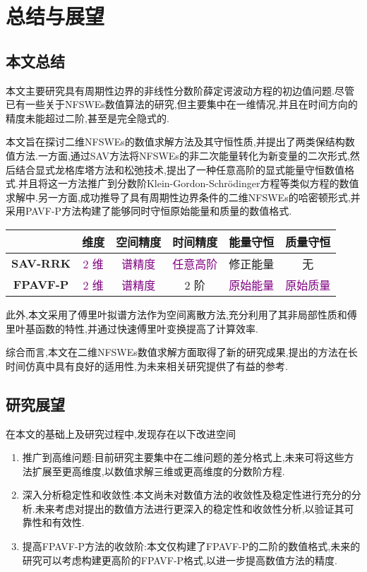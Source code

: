 
\chapter[总结与展望]{总结与展望}
\section{本文总结}
本文主要研究具有周期性边界的非线性分数阶薛定谔波动方程的初边值问题.尽管已有一些关于NFSWEs数值算法的研究,但主要集中在一维情况,并且在时间方向的精度未能超过二阶,甚至是完全隐式的.

本文旨在探讨二维NFSWEs的数值求解方法及其守恒性质,并提出了两类保结构数值方法.一方面,通过SAV方法将NFSWEs的非二次能量转化为新变量的二次形式,然后结合显式龙格库塔方法和松弛技术,提出了一种任意高阶的显式能量守恒数值格式.并且将这一方法推广到分数阶Klein-Gordon-Schr{\"o}dinger方程等类似方程的数值求解中.另一方面,成功推导了具有周期性边界条件的二维NFSWEs的哈密顿形式,并采用PAVF-P方法构建了能够同时守恒原始能量和质量的数值格式.

\begin{table}[H]
    \centering
      \begin{tabular}{cccccc}
      \toprule
      \textcolor[rgb]{0,0,0}{} & \textcolor[rgb]{0,0,0}{\textbf{维度}} & \textcolor[rgb]{0,0,0}{\textbf{空间精度}} & \textcolor[rgb]{0,0,0}{\textbf{时间精度}} & \textcolor[rgb]{0,0,0}{\textbf{能量守恒}} & \textcolor[rgb]{0,0,0}{\textbf{质量守恒}} \\
      \midrule
      \textcolor[rgb]{0,0,0}{\textbf{SAV-RRK}} & \textcolor{purple}{2 维}   & \textcolor{purple}{谱精度}   & \textcolor{purple}{任意高阶}  & 修正能量  & 无 \\
      \midrule
      \textcolor[rgb]{0,0,0}{\textbf{FPAVF-P}} & \textcolor{purple}{2 维}   & \textcolor{purple}{谱精度}   & 2 阶   & \textcolor{purple}{原始能量}  & \textcolor{purple}{原始质量} \\
      \bottomrule
      \end{tabular}%
    \label{tab:3}%
  \end{table}%

此外,本文采用了傅里叶拟谱方法作为空间离散方法,充分利用了其非局部性质和傅里叶基函数的特性,并通过快速傅里叶变换提高了计算效率.

综合而言,本文在二维NFSWEs数值求解方面取得了新的研究成果,提出的方法在长时间仿真中具有良好的适用性,为未来相关研究提供了有益的参考.

\section{研究展望}
在本文的基础上及研究过程中,发现存在以下改进空间

\begin{enumerate}[(1)]
    \item 推广到高维问题:目前研究主要集中在二维问题的差分格式上,未来可将这些方法扩展至更高维度,以数值求解三维或更高维度的分数阶方程.
    
    \item 深入分析稳定性和收敛性:本文尚未对数值方法的收敛性及稳定性进行充分的分析.未来考虑对提出的数值方法进行更深入的稳定性和收敛性分析,以验证其可靠性和有效性.
    
    \item 提高FPAVF-P方法的收敛阶:本文仅构建了FPAVF-P的二阶的数值格式,未来的研究可以考虑构建更高阶的FPAVF-P格式,以进一步提高数值方法的精度.
\end{enumerate}
